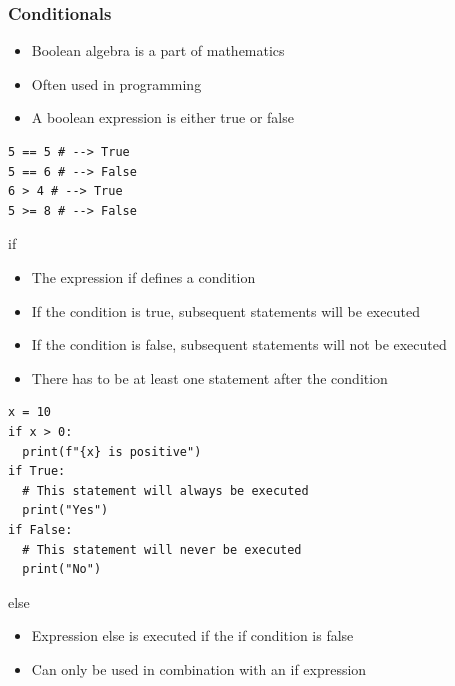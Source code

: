 \documentclass[10pt, a4paper]{beamer} %
\begin{document}
\begin{frame}\frametitle{Conditionals}
  \begin{itemize}
    \item Boolean algebra is a part of mathematics
    \item Often used in programming
    \item A boolean expression is either true or false
  \end{itemize}

  \begin{lstlisting}
5 == 5 # --> True
5 == 6 # --> False
6 > 4 # --> True
5 >= 8 # --> False
\end{lstlisting}

  \framebreak
  {
    \footnotesize

    \begin{examples}

      \begin{block}{\color{mLightBrown}if}

        \begin{itemize}
          \item The expression if defines a condition
          \item If the condition is true, subsequent statements will be executed
          \item If the condition is false, subsequent statements will not be executed
          \item There has to be at least one statement after the condition
        \end{itemize}

      \end{block}
    \end{examples}

    \begin{lstlisting}
x = 10
if x > 0:
  print(f"{x} is positive")
if True:
  # This statement will always be executed
  print("Yes")
if False:
  # This statement will never be executed
  print("No")
\end{lstlisting}
  }
  \framebreak

  \begin{block}{\color{mLightBrown}else}
    \begin{itemize}
      \item Expression else is executed if the if condition is false
      \item Can only be used in combination with an if expression
    \end{itemize}
  \end{block}


\end{frame}
\end{document}

